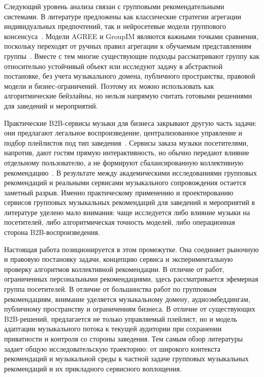 Следующий уровень анализа связан с групповыми рекомендательными системами. В литературе предложены как классические стратегии агрегации индивидуальных предпочтений, так и нейросетевые модели группового консенсуса~\cite{masthoff2004group,masthoff2011handbook,dara2020survey,felfernig2018handbook}. Модели AGREE и GroupIM являются важными точками сравнения, поскольку переходят от ручных правил агрегации к обучаемым представлениям группы~\cite{cao2018agree,sankar2020groupim}. Вместе с тем многие существующие подходы рассматривают группу как относительно устойчивый объект или исследуют задачу в абстрактной постановке, без учета музыкального домена, публичного пространства, правовой модели и бизнес-ограничений. Поэтому их можно использовать как алгоритмические бейзлайны, но нельзя напрямую считать готовыми решениями для заведений и мероприятий.

Практические B2B-сервисы музыки для бизнеса закрывают другую часть задачи: они предлагают легальное воспроизведение, централизованное управление и подбор плейлистов под тип заведения~\cite{zvuk_business_site,yandex_station_business}. Сервисы заказа музыки посетителями, напротив, дают гостям прямую интерактивность, но обычно передают влияние отдельному пользователю, а не формируют сбалансированную коллективную рекомендацию~\cite{gusli_site,bitzabid_site}. В результате между академическими исследованиями групповых рекомендаций и реальными сервисами музыкального сопровождения остается заметный разрыв. Именно практическому применению и проектированию сервисов групповых музыкальных рекомендаций для заведений и мероприятий в литературе уделено мало внимания: чаще исследуется либо влияние музыки на посетителей, либо алгоритмическая точность моделей, либо операционная сторона B2B-воспроизведения.

Настоящая работа позиционируется в этом промежутке. Она соединяет рыночную и правовую постановку задачи, концепцию сервиса и экспериментальную проверку алгоритмов коллективной рекомендации. В отличие от работ, ограниченных персональными рекомендациями, здесь рассматривается эфемерная группа посетителей. В отличие от большинства работ по групповым рекомендациям, внимание уделяется музыкальному домену, аудиоэмбеддингам, публичному пространству и ограничениям бизнеса. В отличие от существующих B2B-решений, предлагается не только управляемый плейлист, но и модель адаптации музыкального потока к текущей аудитории при сохранении приватности и контроля со стороны заведения. Тем самым обзор литературы задает общую исследовательскую траекторию: от широкого контекста рекомендаций и музыкальной среды к частной задаче групповых музыкальных рекомендаций и их прикладного сервисного воплощения.
